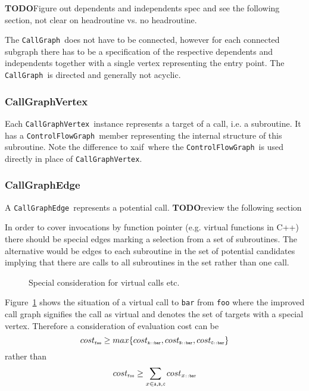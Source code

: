 \documentclass{book}
\newcommand{\fig}[1]{Figure~#1}
\newcommand{\todo}{{\bf TODO}}
\newcommand{\xaif}{xaif}
\newcommand{\CallGraph}{{\tt CallGraph}}
\newcommand{\CallGraphVertex}{{\tt CallGraphVertex}}
\newcommand{\CallGraphEdge}{{\tt CallGraphEdge}}
\newcommand{\ControlFlowGraph}{{\tt ControlFlowGraph}}
\begin{document}
\todo Figure out dependents and independents spec and see the 
following section, not clear on 
headroutine vs. no headroutine.

The \CallGraph\ does not have to be connected, however for each 
connected subgraph there has 
to be a specification of the respective dependents and 
independents together with a single 
vertex representing the entry point.
The \CallGraph\ is directed and generally not acyclic.

\subsubsection{CallGraphVertex} 
Each \CallGraphVertex\ instance represents a target of a call, 
i.e. a subroutine. 
It has a 
\ControlFlowGraph\ member representing the internal structure of 
this subroutine. 
Note the difference to \xaif\ where the \ControlFlowGraph\ is used 
directly in place of 
\CallGraphVertex.

\subsubsection{CallGraphEdge} 
A  \CallGraphEdge\ represents a potential call. 
\todo review the following section

In order to cover invocations by function pointer 
(e.g. virtual functions in C++) 
there should be special edges marking a selection from a set of subroutines. 
The alternative would be edges
to each subroutine in the set of potential candidates implying that there 
are calls to all subroutines in 
the set rather than one call. 

\begin{figure}
\centering {}
\caption{Special consideration for virtual calls etc.}
\label{fig:virtualCall}
\end{figure}

\fig{\ref{fig:virtualCall}} shows the situation of a virtual call to {\tt bar} from 
{\tt foo} where the improved call graph signifies the call as virtual and denotes the 
set of targets with a special vertex.
Therefore a consideration of evaluation cost can be 
\[
cost_{\mbox{\tiny \tt foo}}\geq max\{cost_{\mbox{\tiny \tt A::bar}},cost_{\mbox{\tiny \tt B::bar}},cost_{\mbox{\tiny \tt C::bar}}\}
\]
rather than 
\[
cost_{\mbox{\tiny \tt foo}}\geq \sum\limits_{x \in \mbox{\tiny \tt A,B,C}} cost_{x\mbox{\tiny\tt ::bar}}
\]
\end{document}
